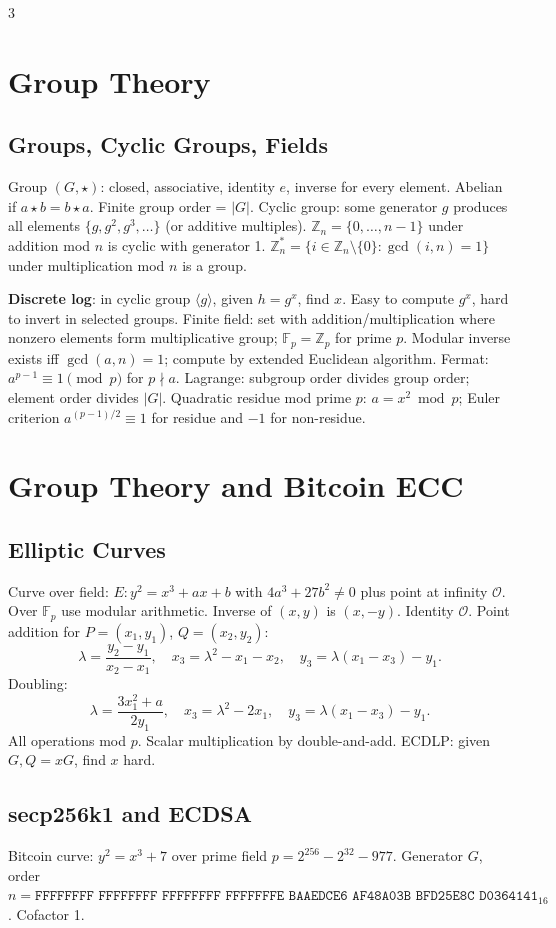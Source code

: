 \documentclass[8pt]{extarticle}
\newcommand{\term}[1]{\textbf{#1}}
\newcommand{\Z}{\mathbb{Z}}
\newcommand{\F}{\mathbb{F}}
\begin{document}
\begin{multicols*}{3}
\section{Group Theory}
\subsection{Groups, Cyclic Groups, Fields}
Group $(G,\star)$: closed, associative, identity $e$, inverse for every element. Abelian if $a\star b=b\star a$. Finite group order = $|G|$. Cyclic group: some generator $g$ produces all elements $\{g,g^2,g^3,\ldots\}$ (or additive multiples). $\Z_n=\{0,\ldots,n-1\}$ under addition mod $n$ is cyclic with generator 1. $\Z_n^*=\{i\in\Z_n\setminus\{0\}:\gcd(i,n)=1\}$ under multiplication mod $n$ is a group.

\term{Discrete log}: in cyclic group $\langle g\rangle$, given $h=g^x$, find $x$. Easy to compute $g^x$, hard to invert in selected groups. Finite field: set with addition/multiplication where nonzero elements form multiplicative group; $\F_p=\Z_p$ for prime $p$. Modular inverse exists iff $\gcd(a,n)=1$; compute by extended Euclidean algorithm. Fermat: $a^{p-1}\equiv1\pmod p$ for $p\nmid a$. Lagrange: subgroup order divides group order; element order divides $|G|$. Quadratic residue mod prime $p$: $a=x^2\bmod p$; Euler criterion $a^{(p-1)/2}\equiv 1$ for residue and $-1$ for non-residue.

\section{Group Theory and Bitcoin ECC}
\subsection{Elliptic Curves}
Curve over field: $E: y^2=x^3+ax+b$ with $4a^3+27b^2\ne0$ plus point at infinity $\mathcal{O}$. Over $\F_p$ use modular arithmetic. Inverse of $(x,y)$ is $(x,-y)$. Identity $\mathcal{O}$. Point addition for $P=(x_1,y_1)$, $Q=(x_2,y_2)$:
\[
\lambda=\frac{y_2-y_1}{x_2-x_1},\quad x_3=\lambda^2-x_1-x_2,\quad y_3=\lambda(x_1-x_3)-y_1.
\]
Doubling:
\[
\lambda=\frac{3x_1^2+a}{2y_1},\quad x_3=\lambda^2-2x_1,\quad y_3=\lambda(x_1-x_3)-y_1.
\]
All operations mod $p$. Scalar multiplication by double-and-add. ECDLP: given $G,Q=xG$, find $x$ hard.

\subsection{secp256k1 and ECDSA}
Bitcoin curve: $y^2=x^3+7$ over prime field $p=2^{256}-2^{32}-977$. Generator $G$, order
$n=\texttt{FFFFFFFF FFFFFFFF FFFFFFFF FFFFFFFE BAAEDCE6 AF48A03B BFD25E8C D0364141}_{16}$. Cofactor 1.


\end{multicols*}
\end{document}
